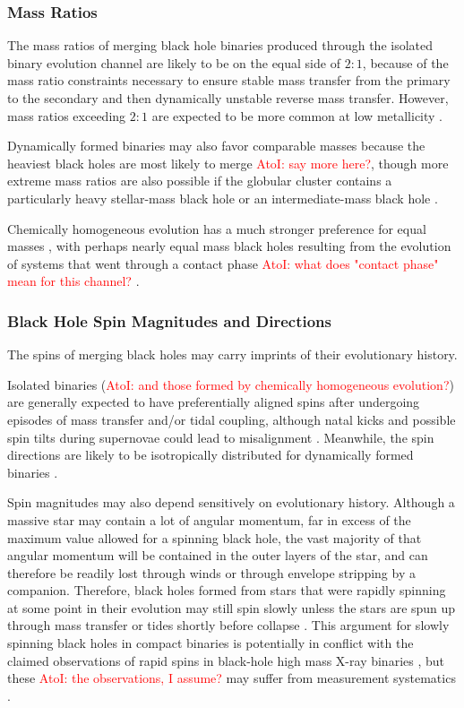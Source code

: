 \documentclass[iop,onecolumn]{revtex4}
\newcommand{\ajf}[1]{\textcolor{red}{AtoI: #1}}
\begin{document}
\subsubsection{Mass Ratios}
The mass ratios of merging black hole binaries produced through the isolated binary evolution channel are likely to be on the equal side of $2:1$, because of the mass ratio constraints necessary to ensure stable mass transfer from the primary to the secondary and then dynamically unstable reverse mass transfer. However, mass ratios exceeding $2:1$ are expected to be more common at low metallicity \citep{Dominik:2012,Stevenson:2017}.

Dynamically formed binaries may also favor comparable masses because the heaviest black holes are most likely to merge \ajf{say more here?}, though more extreme mass ratios are also possible if the globular cluster contains a particularly heavy stellar-mass black hole or an intermediate-mass black hole \citep{Mandel:2008,Belczynski:2014VMS}. 

Chemically homogeneous evolution has a much stronger preference for equal masses \citep{MandeldeMink:2016}, with perhaps nearly equal mass black holes resulting from the evolution of systems that went through a contact phase \ajf{what does "contact phase" mean for this channel?} \citep{Marchant:2016}.  

\subsubsection{Black Hole Spin Magnitudes and Directions}
The spins of merging black holes may carry imprints of their evolutionary history. 

 Isolated binaries (\ajf{and those formed by chemically homogeneous evolution?}) are generally expected to have preferentially aligned spins after undergoing episodes of mass transfer and/or tidal coupling, although natal kicks and possible spin tilts during supernovae could lead to misalignment \citep[e.g.,][]{Farr:2011}.  Meanwhile, the spin directions are likely to be isotropically distributed for dynamically formed binaries \citep[e.g.,][]{Rodriguez:2016spin}.

Spin magnitudes may also depend sensitively on evolutionary history.  Although a massive star may contain a lot of angular momentum, far in excess of the maximum value allowed for a spinning black hole, the vast majority of that angular momentum will be contained in the outer layers of the star, and can therefore be readily lost through winds or through envelope stripping by a companion.  Therefore, black holes formed from stars that were rapidly spinning at some point in their evolution may still spin slowly unless the stars are spun up through mass transfer or tides shortly before collapse \citep{Kushnir:2016,HotokezakaPiran:2017,Zaldarriaga:2017}.   This argument for slowly spinning black holes in compact binaries is potentially in conflict with the claimed observations of rapid spins in black-hole high mass X-ray binaries \citep{MillerMiller:2015}, but these \ajf{the observations, I assume?} may suffer from measurement systematics \citep[e.g.,][]{Kawano:2017}.  
\end{document}
